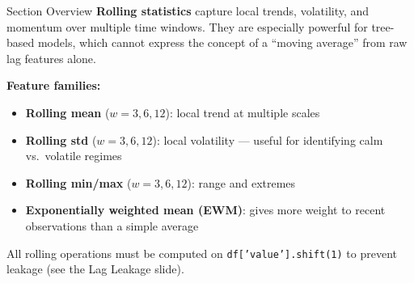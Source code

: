 \documentclass[aspectratio=169, 10pt]{beamer}
\begin{document}

\begin{frame}{Section Overview}
  \textbf{Rolling statistics} capture local trends, volatility,
  and momentum over multiple time windows. They are especially
  powerful for tree-based models, which cannot express the concept
  of a ``moving average'' from raw lag features alone.

  \medskip
  \textbf{Feature families:}
  \begin{itemize}
    \item \textbf{Rolling mean} ($w = 3, 6, 12$): local trend
          at multiple scales
    \item \textbf{Rolling std} ($w = 3, 6, 12$): local
          volatility --- useful for identifying calm vs.\ volatile
          regimes
    \item \textbf{Rolling min/max} ($w = 3, 6, 12$): range and
          extremes
    \item \textbf{Exponentially weighted mean (EWM)}: gives
          more weight to recent observations than a simple average
  \end{itemize}

  \medskip
  All rolling operations must be computed on
  \texttt{df['value'].shift(1)} to prevent leakage
  (see the Lag Leakage slide).
\end{frame}
\end{document}
